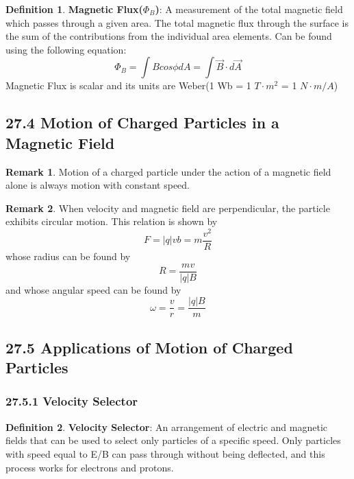 \documentclass[12pt]{amsart}
\theoremstyle{definition}
\newtheorem{definition}{Definition} %
\newtheorem*{remark}{Remark}        %
\numberwithin{equation}{theorem}    %
\begin{document}
\begin{definition}
    \textbf{Magnetic Flux($\Phi_B$)}:
    A measurement of the total magnetic field which passes through a given area. The total magnetic flux through the surface is the sum of the contributions from the individual area elements. Can be found using the following equation:
    $$\Phi_B = \int B cos\phi dA = \int\vec{B}\cdot d \vec{A}$$
    Magnetic Flux is scalar and its units are Weber(1 Wb = 1 $T\cdot m^2$ = 1 $N\cdot m/A$)

\end{definition}

\subsection*{27.4 Motion of Charged Particles in a Magnetic Field}

\begin{remark}
    Motion of a charged particle under the action of a magnetic field alone is always motion with constant speed.
\end{remark}

\begin{remark}
    When velocity and magnetic field are perpendicular, the particle exhibits circular motion. This relation is shown by $$F = |q|vb = m\frac{v^2}{R}$$ whose radius can be found by $$R = \frac{mv}{|q|B}$$ and whose angular speed can be found by $$\omega = \frac{v}{r} = \frac{|q|B}{m}$$
\end{remark}

\subsection*{27.5 Applications of Motion of Charged Particles}

\subsubsection*{27.5.1 Velocity Selector}

\begin{definition}
    \textbf{Velocity Selector}:
    An arrangement of electric and magnetic fields that can be used to select 
    only particles of a specific speed. Only particles with speed equal to 
    E/B can pass through without being deflected, and this process works for 
    electrons and protons.
\end{definition}
\end{document}
